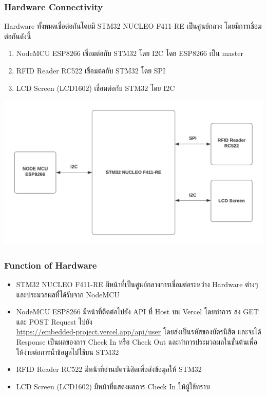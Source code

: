 \documentclass[fontsize=14pt]{extarticle}
\begin{document}
\subsubsection{Hardware Connectivity}
Hardware ทั้งหมดเชื่อต่อกันโดยมี STM32 NUCLEO F411-RE เป็นศูนย์กลาง โดยมีการเชื่อมต่อกันดังนี้
\begin{enumerate}
    \item NodeMCU ESP8266 เชื่อมต่อกับ STM32 โดย I2C โดย ESP8266 เป็น master
    \item RFID Reader RC522 เชื่อมต่อกับ STM32 โดย SPI
    \item LCD Screen (LCD1602) เชื่อมต่อกับ STM32 โดย I2C
\end{enumerate}
\includegraphics[]{Diagram.png}
\subsubsection{Function of Hardware}
\begin{itemize}
    \item STM32 NUCLEO F411-RE มีหน้าที่เป็นศูนย์กลางการเชื่อมต่อระหว่าง Hardware ต่างๆ และประมวลผลที่ได้รับจาก NodeMCU
    \item NodeMCU ESP8266 มีหน้าที่ติดต่อไปยัง API ที่ Host บน Vercel  โดยทำการ ส่ง GET และ POST Request ไปยัง \\ \url{https://embedded-project.vercel.app/api/user}  โดยส่งเป็นรหัสของบัตรนิสิต และจะได้ Response เป็นผลของการ Check In หรือ Check Out และทำการประมวลผลในขั้นต้นเพื่อให้ง่ายต่อการน้ำข้อมูลไปใช้บน STM32
    \item RFID Reader RC522 มีหน้าที่อ่านบัตรนิสิตเพื่อส่งข้อมูลให้ STM32
    \item LCD Screen (LCD1602) มีหน้าที่แสดงผลการ Check In ให้ผู้ใช้ทราบ
\end{itemize}
\end{document}
